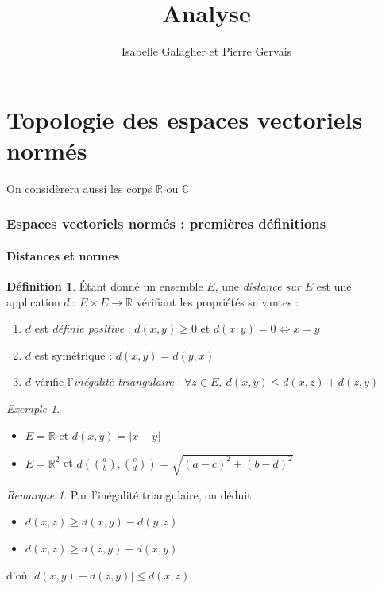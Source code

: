 \documentclass[]{article}
\title{Analyse}
\author{Isabelle Galagher et Pierre Gervais}
\theoremstyle{remark}
\newtheorem{myrem}{Remarque}
\newtheorem{myexmpl}{Exemple}
\theoremstyle{definition}
\newtheorem{mydef}{Définition}
\begin{document}
\maketitle

\tableofcontents

\part{Topologie des espaces vectoriels normés}

On considèrera aussi les corps $\mathbb{R}$ ou $\mathbb{C}$

\section{Espaces vectoriels normés : premières définitions}

\subsection{Distances et normes}

\begin{mydef}
	Étant donné un ensemble $E$, une \textit{distance sur $E$} est une application $d~: ~ E \times E \longrightarrow \mathbb{R}$ vérifiant les propriétés suivantes :
	\begin{enumerate}
		\item $d$ est \textit{définie positive} : $d(x,y) \geqslant 0$ et $d(x,y) = 0 \Leftrightarrow x=y$
		\item $d$ est symétrique : $d(x,y)=d(y,x)$
		\item $d$ vérifie l'\textit{inégalité triangulaire} : $\forall z \in E, ~ d(x,y) \leqslant d(x,z) + d(z, y)$
	\end{enumerate}
\end{mydef}

\begin{myexmpl}
	\leavevmode
	\begin{itemize}
		\item $E=\mathbb{R}$ et $d(x, y) = |x-y|$
		\item $E=\mathbb{R}^2$ et $d\left(\binom{a}{b},\binom{c}{d}\right)=\sqrt{(a-c)^2+(b-d)^2}$
	\end{itemize}
\end{myexmpl}

\begin{myrem}
	Par l'inégalité triangulaire, on déduit
	\begin{itemize}
		\item $d(x,z) \geqslant d(x, y) - d(y, z)$
		\item $d(x, z) \geqslant d(z, y) - d(x, y)$
	\end{itemize}
	d'où $|d(x, y) - d(z, y)| \leqslant d(x, z)$
\end{myrem}
\end{document}

